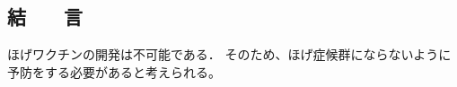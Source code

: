 \begin{small}
\section{結　　言}
ほげワクチンの開発は不可能である．
そのため、ほげ症候群にならないように予防をする必要があると考えられる。







{
\small
 \setlength{\kanjiskip}{0.0zw plus.01zw} %
 \setlength{\baselineskip}{9pt}        %
 \setlength{\itemsep}{0.2pt}             %
 \setlength{\lineskip}{0pt}              %


}



\end{small}

